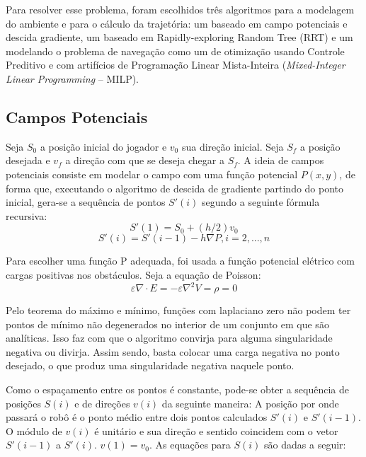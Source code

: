 \documentclass[a4paper,12pt]{article}
\begin{document}
Para resolver esse problema, foram escolhidos três algoritmos para a modelagem do ambiente e para o cálculo da trajetória: um baseado em campo potenciais e descida gradiente, um baseado em Rapidly-exploring Random Tree (RRT) e um modelando o problema de navegação como um de otimização usando Controle Preditivo e com artifícios de Programação Linear Mista-Inteira (\textit{Mixed-Integer Linear Programming} -- MILP).

\subsection{Campos Potenciais}

Seja $S_{0}$ a posição inicial do jogador e $v_{0}$ sua direção inicial. Seja $S_{f}$ a posição desejada e $v_{f}$ a direção com que se deseja chegar a $S_{f}$. A ideia de campos potenciais consiste em modelar o campo com uma função potencial $P(x,y)$, de forma que, executando o algoritmo de descida de gradiente partindo do ponto inicial, gera-se a sequência de pontos $S'(i)$ segundo a seguinte fórmula recursiva:
\begin{equation}
S'(1) = S_{0} + (h/2)v_{0}
\end{equation}
\begin{equation}
S'(i) = S'(i-1) - h\nabla P, i = 2,...,n
\end{equation}

Para escolher uma função P adequada, foi usada a função potencial elétrico com cargas positivas nos obstáculos. Seja a equação de Poisson:
\begin{equation}
\varepsilon \nabla \cdot E = -\varepsilon \nabla ^2 V=\rho = 0
\end{equation}

Pelo teorema do máximo e mínimo, funções com laplaciano zero não podem ter pontos de mínimo não degenerados no interior de um conjunto em que são analíticas. Isso faz com que o algoritmo convirja para alguma singularidade negativa ou divirja. Assim sendo, basta colocar uma carga negativa no ponto desejado, o que produz uma singularidade negativa naquele ponto.

Como o espaçamento entre os pontos é constante, pode-se obter a sequência de posições $S(i)$ e de direções $v(i)$ da seguinte maneira: A posição por onde passará o robô é o ponto médio entre dois pontos calculados $S'(i)$ e $S'(i-1)$. O módulo de $v(i)$ é unitário e sua direção e sentido coincidem com o vetor $S'(i-1)$ a $S'(i)$. $v(1) = v_{0}$. As equações para $S(i)$ são dadas a seguir:
\end{document}
